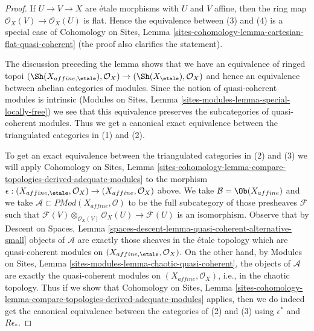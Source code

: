 \begin{proof}
If $U \to V \to X$ are \'etale morphisms with $U$ and $V$ affine,
then the ring map $\mathcal{O}_X(V) \to \mathcal{O}_X(U)$ is flat. Hence
the equivalence between (3) and (4) is a special case of
Cohomology on Sites, Lemma
\ref{sites-cohomology-lemma-cartesian-flat-quasi-coherent}
(the proof also clarifies the statement).

\medskip\noindent
The discussion preceding the lemma shows that we have an equivalence of
ringed topoi
$(\Sh(X_{affine, \etale}), \mathcal{O}_X) \to (\Sh(X_\etale), \mathcal{O}_X)$
and hence an equivalence between abelian categories of modules.
Since the notion of quasi-coherent modules is intrinsic
(Modules on Sites, Lemma \ref{sites-modules-lemma-special-locally-free})
we see that this equivalence preserves the subcategories
of quasi-coherent modules. Thus  we get a canonical exact equivalence
between the triangulated categories in (1) and (2).

\medskip\noindent
To get an exact equivalence between the triangulated categories
in (2) and (3) we will apply Cohomology on Sites, Lemma
\ref{sites-cohomology-lemma-compare-topologies-derived-adequate-modules}
to the morphism $\epsilon : (X_{affine, \etale}, \mathcal{O}_X) \to
(X_{affine}, \mathcal{O}_X)$ above. We take
$\mathcal{B} = \Ob(X_{affine})$ and we take
$\mathcal{A} \subset \textit{PMod}(X_{affine}, \mathcal{O})$
to be the full subcategory of those presheaves $\mathcal{F}$
such that $\mathcal{F}(V) \otimes_{\mathcal{O}_X(V)} \mathcal{O}_X(U)
\to \mathcal{F}(U)$ is an isomorphism. Observe that by
Descent on Spaces, Lemma
\ref{spaces-descent-lemma-quasi-coherent-alternative-small}
objects of $\mathcal{A}$ are exactly those sheaves in the \'etale
topology which are quasi-coherent modules on
$(X_{affine, \etale}, \mathcal{O}_X)$.
On the other hand, by Modules on Sites, Lemma
\ref{sites-modules-lemma-chaotic-quasi-coherent},
the objects of $\mathcal{A}$ are exactly the quasi-coherent modules
on $(X_{affine}, \mathcal{O}_X)$, i.e., in the chaotic topology.
Thus if we show that Cohomology on Sites, Lemma
\ref{sites-cohomology-lemma-compare-topologies-derived-adequate-modules}
applies, then we do indeed get the canonical equivalence between the
categories of (2) and (3) using $\epsilon^*$ and $R\epsilon_*$.


\end{proof}
